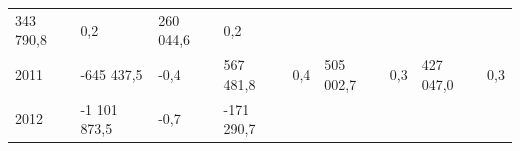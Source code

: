 \begin{longtable}[]{@{}lllllllll@{}}
\begin{minipage}[t]{0.12\columnwidth}
343 790,8\strut
\end{minipage} & \begin{minipage}[t]{0.06\columnwidth}\raggedright
0,2\strut
\end{minipage} & \begin{minipage}[t]{0.10\columnwidth}\raggedright
260 044,6\strut
\end{minipage} & \begin{minipage}[t]{0.06\columnwidth}\raggedright
0,2\strut
\end{minipage}\tabularnewline
\begin{minipage}[t]{0.05\columnwidth}\raggedright
2011\strut
\end{minipage} & \begin{minipage}[t]{0.10\columnwidth}\raggedright
-645 437,5\strut
\end{minipage} & \begin{minipage}[t]{0.06\columnwidth}\raggedright
-0,4\strut
\end{minipage} & \begin{minipage}[t]{0.16\columnwidth}\raggedright
567 481,8\strut
\end{minipage} & \begin{minipage}[t]{0.06\columnwidth}\raggedright
0,4\strut
\end{minipage} & \begin{minipage}[t]{0.12\columnwidth}\raggedright
505 002,7\strut
\end{minipage} & \begin{minipage}[t]{0.06\columnwidth}\raggedright
0,3\strut
\end{minipage} & \begin{minipage}[t]{0.10\columnwidth}\raggedright
427 047,0\strut
\end{minipage} & \begin{minipage}[t]{0.06\columnwidth}\raggedright
0,3\strut
\end{minipage}\tabularnewline
\begin{minipage}[t]{0.05\columnwidth}\raggedright
2012\strut
\end{minipage} & \begin{minipage}[t]{0.10\columnwidth}\raggedright
-1 101 873,5\strut
\end{minipage} & \begin{minipage}[t]{0.06\columnwidth}\raggedright
-0,7\strut
\end{minipage} & \begin{minipage}[t]{0.16\columnwidth}\raggedright
-171 290,7\strut

\end{minipage}
\end{longtable}
